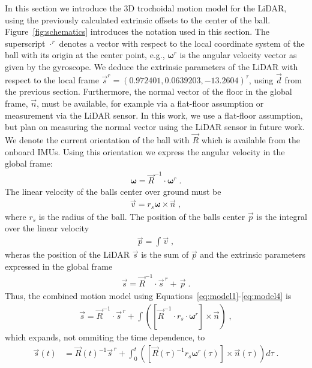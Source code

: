In this section we introduce the 3D trochoidal motion model for the LiDAR, using the previously calculated extrinsic offsets to the center of the ball.
Figure~\ref{fig:schematics} introduces the notation used in this section.
The superscript $\cdot^r$ denotes a vector with respect to the local coordinate system of the ball with its origin at the center point, e.g., $\boldsymbol{\omega}^r$ is the angular velocity vector as given by the gyroscope. 
We deduce the extrinsic parameters of the LiDAR with respect to the local frame $\vec{s}^r = (0.972401, 0.0639203, -13.2604)^{\tau}$, using $\vec{d}$ from the previous section.
Furthermore, the normal vector of the floor in the global frame, $\vec{n}$, must be available, for example via a flat-floor assumption or measurement via the LiDAR sensor.
In this work, we use a flat-floor assumption, but plan on measuring the normal vector using the LiDAR sensor in future work. 
We denote the current orientation of the ball with $\vec{R}$ which is available from the onboard IMUs.
Using this orientation we express the angular velocity in the global frame:
\begin{align}
\boldsymbol{\omega} = \vec{R}^{-1} \cdot \boldsymbol{\omega}^r\;.
\label{eq:model1}
\end{align}
The linear velocity of the balls center over ground must be 
\begin{align}
\vec{v} = r_s \boldsymbol{\omega} \times \vec{n}\;,
\label{eq:model2}
\end{align}
where $r_s$ is the radius of the ball.
The position of the balls center $\vec{p}$ is the integral over the linear velocity 
\begin{align}
\vec{p} = \int \vec{v} \;,
\label{eq:model3}
\end{align}
wheras the position of the LiDAR $\vec{s}$ is the sum of $\vec{p}$ and the extrinsic parameters expressed in the global frame
\begin{align}
\vec{s} = \vec{R}^{-1} \cdot \vec{s}^{\,r} + \,\vec{p}\;.
\label{eq:model4}
\end{align}
Thus, the combined motion model using Equations~\eqref{eq:model1}-\eqref{eq:model4} is 
\begin{align}
\vec{s} = \vec{R}^{-1} \cdot \vec{s}^{\,r} + \int \left( \left[ \vec{R}^{-1} \cdot r_s \cdot \boldsymbol{\omega}^r \right] \times \vec{n}\right)\;,
\end{align}
which expands, not ommiting the time dependence, to
\begin{align}
  \vec{s}(t) &= \vec{R}(t)^{-1} \vec{s}^{\,r} + \int_0^t\left( \left[ \vec{R}(\tau)^{-1} r_s \boldsymbol{\omega}^r(\tau) \right]\times \vec{n}(\tau) \right) d\tau\;.
\end{align}
